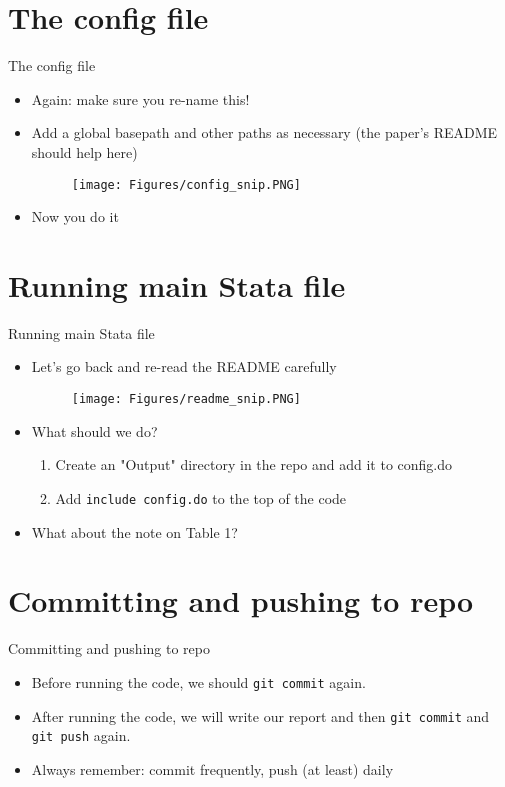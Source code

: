 \documentclass[xcolor={dvipsnames}]{beamer}
\theoremstyle{definition}
\begin{document}
\section{The config file}
\begin{frame}{The config file}
\begin{itemize}
    \item Again: make sure you re-name this!
    \item Add a global basepath and other paths as necessary (the paper's README should help here)
    \begin{figure}
        \centering
        \texttt{[image: Figures/config\_snip.PNG]}
    \end{figure}
    \pause
    \item Now you do it
\end{itemize}
\end{frame}

\section{Running main Stata file}
\begin{frame}{Running main Stata file}
\begin{itemize}
    \item Let's go back and re-read the README carefully
    \begin{figure}
        \centering
        \texttt{[image: Figures/readme\_snip.PNG]}
    \end{figure}
    \pause
    \item What should we do?
    \pause
    \begin{enumerate}
        \item Create an "Output" directory in the repo and add it to config.do
        \item Add \texttt{include config.do} to the top of the code
    \end{enumerate}
    \pause
    \item What about the note on Table 1?
\end{itemize}
\end{frame}

\section{Committing and pushing to repo}
\begin{frame}{Committing and pushing to repo}
\begin{itemize}
    \item Before running the code, we should \texttt{git commit} again.
    \item After running the code, we will write our report and then \texttt{git commit} and \texttt{git push} again.
    \item Always remember: commit frequently, push (at least) daily
\end{itemize}
\end{frame}
\end{document}
